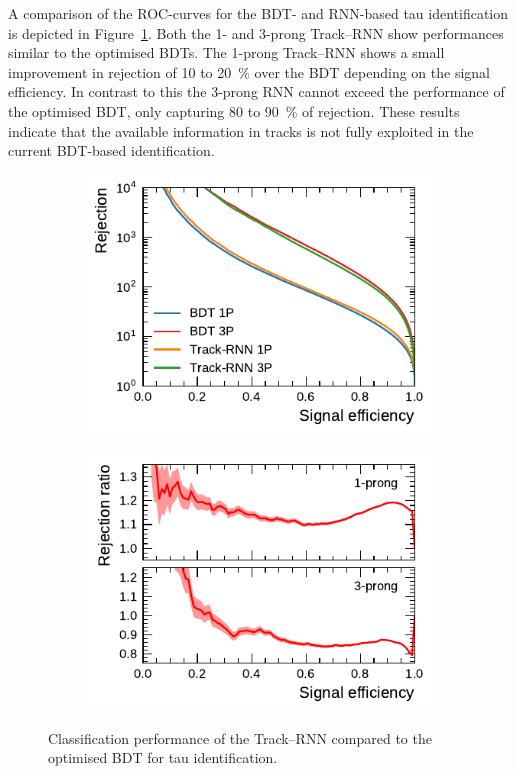 A comparison of the ROC-curves for the BDT- and RNN-based tau identification is
depicted in Figure~\ref{fig:track_rnn_roc_ratios}. Both the 1- and 3-prong
Track--RNN show performances similar to the optimised BDTs. The 1-prong
Track--RNN shows a small improvement in rejection of \num{10} to
\SI{20}{\percent} over the BDT depending on the signal efficiency. In contrast
to this the 3-prong RNN cannot exceed the performance of the optimised BDT, only
capturing \num{80} to \SI{90}{\percent} of rejection. These results indicate
that the available information in tracks is not fully exploited in the current
BDT-based identification.

\begin{figure}[htb]
  \begin{subfigure}[t]{0.48\textwidth}
    \centering
    \includegraphics{./figures/rnn/track/roc.pdf}
  \end{subfigure}\hfill
  \begin{subfigure}[t]{0.48\textwidth}
    \centering
    \includegraphics{./figures/rnn/track/ratios.pdf}
  \end{subfigure}
  \caption{Classification performance of the Track--RNN compared to the
    optimised BDT for tau identification.}
  \label{fig:track_rnn_roc_ratios}
\end{figure}

